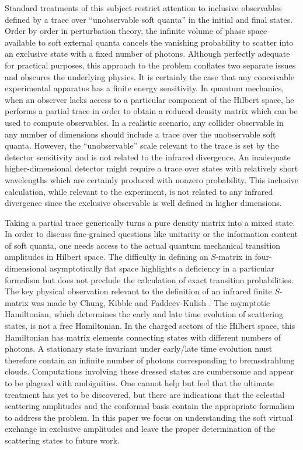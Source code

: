\documentclass[11pt]{article}
\begin{document}
Standard treatments of this subject restrict attention to inclusive observables defined by a trace over ``unobservable soft quanta'' in the initial and final states. Order by order in perturbation theory, the infinite volume of phase space available to soft external quanta cancels the vanishing probability to scatter into an exclusive state with a fixed number of photons. Although perfectly adequate for practical purposes, this approach to the problem conflates two separate issues and obscures the underlying physics. It is certainly the case that any conceivable experimental apparatus has a finite energy sensitivity. In quantum mechanics, when an observer lacks access to a particular component of the Hilbert space, he performs a partial trace in order to obtain a reduced density matrix which can be used to compute observables. In a realistic scenario, any collider observable in any number of dimensions should include a trace over the unobservable soft quanta. However, the ``unobservable'' scale relevant to the trace is set by the detector sensitivity and is not related to the infrared divergence. An inadequate higher-dimensional detector might require a trace over states with relatively short wavelengths which are certainly produced with nonzero probability. This inclusive calculation, while relevant to the experiment, is not related to any infrared divergence since the exclusive observable is well defined in higher dimensions.

Taking a partial trace generically turns a pure density matrix into a mixed state. In order to discuss fine-grained questions like unitarity or the information content of soft quanta, one needs access to the actual quantum mechanical transition amplitudes in Hilbert space. The difficulty in defining an $S$-matrix in four-dimensional asymptotically flat space highlights a deficiency in a particular formalism but does not preclude the calculation of exact transition probabilities. 
The key physical observation relevant to the definition of an infrared finite $S$-matrix was made by Chung, Kibble and Faddeev-Kulish \cite{Chung:1965zza,Kibble:1968sfb,Kibble:1969ip,Kibble:1969ep,Kibble:1969kd,Kulish:1970ut}. The asymptotic Hamiltonian, which determines the early and late time evolution of scattering states, is not a free Hamiltonian. In the charged sectors of the Hilbert space, this Hamiltonian has matrix elements connecting states with different numbers of photons. A stationary state invariant under early/late time evolution must therefore contain an infinite number of photons corresponding to bremsstrahlung clouds. Computations involving these dressed states are cumbersome and appear to be plagued with ambiguities. One cannot help but feel that the ultimate treatment has yet to be discovered, but there are indications that the celestial scattering amplitudes and the conformal basis contain the appropriate formalism to address the problem\cite{Kapec:2017tkm,Arkani-Hamed:2020gyp}. In this paper we focus on understanding the soft virtual exchange in exclusive amplitudes and leave the proper determination of the scattering states to future work.  
\end{document}
